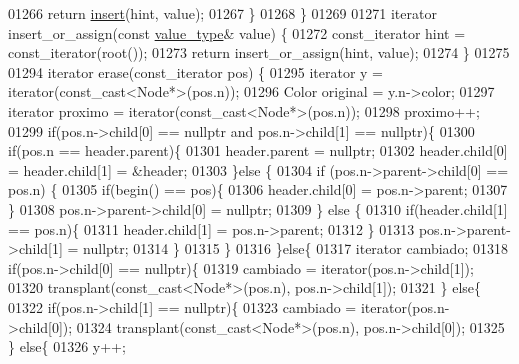 \begin{DoxyCode}
01266             \textcolor{keywordflow}{return} \hyperlink{classaed2_1_1map_a6941cde9a79c27f054b5c97a587a1854_a6941cde9a79c27f054b5c97a587a1854}{insert}(hint, value);
01267         \}
01268     \}
01269 
01271     iterator insert\_or\_assign(\textcolor{keyword}{const} \hyperlink{classaed2_1_1map_a719db98e0ff9a837610f76be33264680_a719db98e0ff9a837610f76be33264680}{value\_type}& value) \{
01272         const\_iterator hint = const\_iterator(root());
01273         \textcolor{keywordflow}{return} insert\_or\_assign(hint, value);
01274     \}
01275 
01294     iterator erase(const\_iterator pos) \{
01295         iterator y = iterator(const\_cast<Node*>(pos.n));
01296         Color original = y.n->color;
01297         iterator proximo = iterator(const\_cast<Node*>(pos.n));
01298         proximo++;
01299         \textcolor{keywordflow}{if}(pos.n->child[0] == \textcolor{keyword}{nullptr} and pos.n->child[1] == \textcolor{keyword}{nullptr})\{
01300             \textcolor{keywordflow}{if}(pos.n == header.parent)\{
01301                 header.parent = \textcolor{keyword}{nullptr};
01302                 header.child[0] = header.child[1] = &header;
01303             \}\textcolor{keywordflow}{else} \{
01304                 \textcolor{keywordflow}{if} (pos.n->parent->child[0] == pos.n) \{
01305                     \textcolor{keywordflow}{if}(begin() == pos)\{
01306                         header.child[0] = pos.n->parent;
01307                     \}
01308                     pos.n->parent->child[0] = \textcolor{keyword}{nullptr};
01309                 \} \textcolor{keywordflow}{else} \{
01310                     \textcolor{keywordflow}{if}(header.child[1] == pos.n)\{
01311                         header.child[1] = pos.n->parent;
01312                     \}
01313                     pos.n->parent->child[1] = \textcolor{keyword}{nullptr};
01314                 \}
01315             \}
01316         \}\textcolor{keywordflow}{else}\{
01317             iterator cambiado;
01318             \textcolor{keywordflow}{if}(pos.n->child[0] == \textcolor{keyword}{nullptr})\{
01319                 cambiado = iterator(pos.n->child[1]);
01320                 transplant(const\_cast<Node*>(pos.n), pos.n->child[1]);
01321             \} \textcolor{keywordflow}{else}\{
01322                 \textcolor{keywordflow}{if}(pos.n->child[1] == \textcolor{keyword}{nullptr})\{
01323                     cambiado = iterator(pos.n->child[0]);
01324                     transplant(const\_cast<Node*>(pos.n), pos.n->child[0]);
01325                 \} \textcolor{keywordflow}{else}\{
01326                     y++;

\end{DoxyCode}

